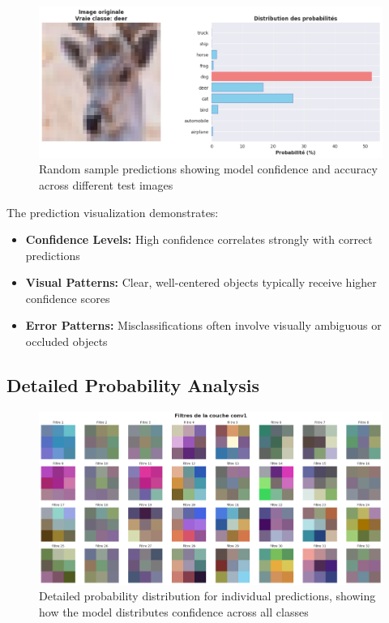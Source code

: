 \documentclass[11pt,a4paper]{article}
\begin{document}
\begin{figure}[H]
    \centering
    \includegraphics[width=\textwidth]{tp2_cnn_img/cell_24_output_01_image_08.png}
    \caption{Random sample predictions showing model confidence and accuracy across different test images}
    \label{fig:predictions}
\end{figure}

The prediction visualization demonstrates:

\begin{itemize}
    \item \textbf{Confidence Levels:} High confidence correlates strongly with correct predictions
    \item \textbf{Visual Patterns:} Clear, well-centered objects typically receive higher confidence scores
    \item \textbf{Error Patterns:} Misclassifications often involve visually ambiguous or occluded objects
\end{itemize}

\subsection{Detailed Probability Analysis}

\begin{figure}[H]
    \centering
    \includegraphics[width=\textwidth]{tp2_cnn_img/cell_25_output_00_image_09.png}
    \caption{Detailed probability distribution for individual predictions, showing how the model distributes confidence across all classes}
    \label{fig:probability_analysis}
\end{figure}
\end{document}
